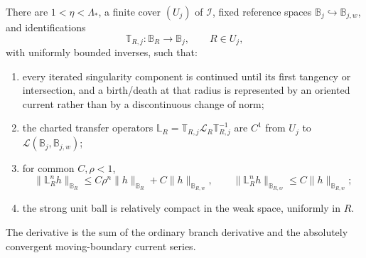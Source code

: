 \begin{lemma}
\label{lem:r3-a2-atlas}
There are \(1<\eta<\Lambda_*\), a finite cover \((U_j)\) of
\(\mathcal I\), fixed reference spaces
\(\mathbb B_j\hookrightarrow\mathbb B_{j,w}\), and identifications
\[
 \mathbb T_{R,j}:\mathbb B_R\longrightarrow\mathbb B_j,
 \qquad R\in U_j,
\]
with uniformly bounded inverses, such that:
\begin{enumerate}[label=(\roman*)]
\item every iterated singularity component is continued until its first
      tangency or intersection, and a birth/death at that radius is represented
      by an oriented current rather than by a discontinuous change of norm;
\item the charted transfer operators
\(\mathbb L_R=\mathbb T_{R,j}\mathcal L_R\mathbb T_{R,j}^{-1}\) are
\(C^1\) from \(U_j\) to
\(\mathcal L(\mathbb B_j,\mathbb B_{j,w})\);
\item for common \(C,\rho<1\),
\[
 \|\mathbb L_R^nh\|_{\mathbb B_R}
 \le C\rho^n\|h\|_{\mathbb B_R}
     +C\|h\|_{\mathbb B_{R,w}},
 \qquad
 \|\mathbb L_R^nh\|_{\mathbb B_{R,w}}
 \le C\|h\|_{\mathbb B_{R,w}};
\]
\item the strong unit ball is relatively compact in the weak space, uniformly
      in \(R\).
\end{enumerate}
The derivative is the sum of the ordinary branch derivative and the absolutely
convergent moving-boundary current series.
\end{lemma}


